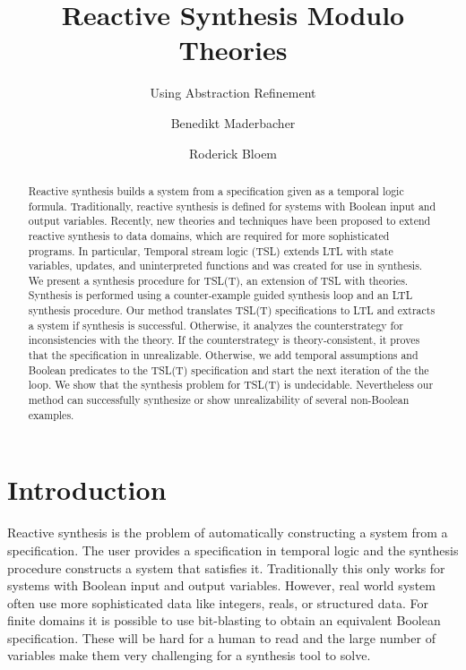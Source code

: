 \documentclass[runningheads]{llncs}
\begin{document}
%
\title{Reactive Synthesis Modulo Theories}
\subtitle{Using Abstraction Refinement}
%
%
\author{Benedikt Maderbacher \and Roderick Bloem}
%
\authorrunning{}
%
%
\maketitle              %
%
\begin{abstract}
Reactive synthesis builds a system from a specification given as a temporal logic formula.
Traditionally, reactive synthesis is defined for systems with Boolean input and output variables.
Recently, new theories and techniques have been proposed to extend reactive synthesis to data domains, which are required for more sophisticated programs.
In particular, Temporal stream logic (TSL) \cite{finkbeiner2019a} extends LTL with state variables, updates, and uninterpreted functions and was created for use in synthesis.
We present a synthesis procedure for TSL(T), an extension of TSL with theories.
Synthesis is performed using a counter-example guided synthesis loop and an LTL synthesis procedure.
Our method translates TSL(T) specifications to LTL and extracts a system if synthesis is successful.
Otherwise, it analyzes the counterstrategy for inconsistencies with the theory. If the counterstrategy is theory-consistent, it proves that the specification in unrealizable. Otherwise, we add temporal assumptions and Boolean predicates to the TSL(T) specification and start the next iteration of the the loop.
We show that the synthesis problem for TSL(T) is undecidable. Nevertheless our method can successfully synthesize or show unrealizability of several non-Boolean examples. 
\end{abstract}
%
%



\section{Introduction}

Reactive synthesis \cite{DBLP:reference/mc/BloemCJ18} is the problem of automatically constructing a system from a specification.
The user provides a specification in temporal logic and the synthesis procedure constructs a system that satisfies it.
Traditionally this only works for systems with Boolean input and output variables.
However, real world system often use more sophisticated data like integers, reals, or structured data.
For finite domains it is possible to use bit-blasting to obtain an equivalent Boolean specification.
These will be hard for a human to read and the large number of variables make them  very challenging for a synthesis tool to solve.
\end{document}
